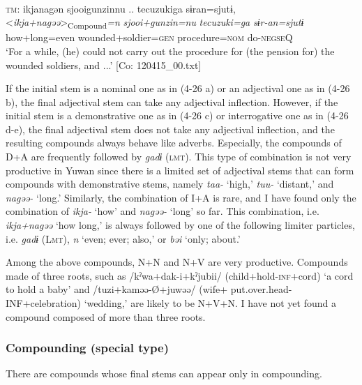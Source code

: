 \ex{}\\\label{ex:4.26e}
\glll    \textsc{tm}:  ikjanagən  {\textbar}sjooigunzin{\textbar}nu ..  {\textbar}tecuzuki{\textbar}ga  sɨran=sjutɨ,    \\
      <\textit{ikja+nagəə}>\textsubscript{Compound}\textit{=n}  \textit{sjooi+gunzin=nu}  \textit{tecuzuki=ga}       \textit{sɨr-an=sjutɨ}    \\
      how+long=even  wounded+soldier=\textsc{gen}  procedure=\textsc{nom}     do-\textsc{negseQ}        \\
    \glt       ‘For a while, (he) could not carry out the procedure for (the pension for) the wounded soldiers, and ...’ [Co: 120415\_00.txt]
    \z
\z

If the initial stem is a nominal one as in (4-26 a) or an adjectival one as in (4-26 b), the final adjectival stem can take any adjectival inflection. However, if the initial stem is a demonstrative one as in (4-26 c) or interrogative one as in (4-26 d-e), the final adjectival stem does not take any adjectival inflection, and the resulting compounds always behave like adverbs. Especially, the compounds of D+A are frequently followed by \textit{gadɨ} (\textsc{lmt}). This type of combination is not very productive in Yuwan since there is a limited set of adjectival stems that can form compounds with demonstrative stems, namely \textit{taa-} ‘high,’ \textit{tuu-} ‘distant,’ and \textit{nagəə-} ‘long.’ Similarly, the combination of I+A is rare, and I have found only the combination of \textit{ikja-} ‘how’ and \textit{nagəə-} ‘long’ so far. This combination, i.e. \textit{ikja+nagəə} ‘how long,’ is always followed by one of the following limiter particles, i.e. \textit{gadɨ} (L\textsc{mt}), \textit{n} ‘even; ever; also,’ or \textit{bəi} ‘only; about.’

Among the above compounds, N+N and N+V are very productive. Compounds made of three roots, such as /kˀwa+dak-i+kˀjubii/ (child+hold-\textsc{inf}+cord) ‘a cord to hold a baby’ and /tuzi+kaməə-Ø+juwəə/ (wife+ put.over.head-INF+celebration) ‘wedding,’ are likely to be N+V+N. I have not yet found a compound composed of more than three roots.

\subsubsection{Compounding (special type)}\label{sec:4.2.3.2}

There are compounds whose final stems can appear only in compounding.


